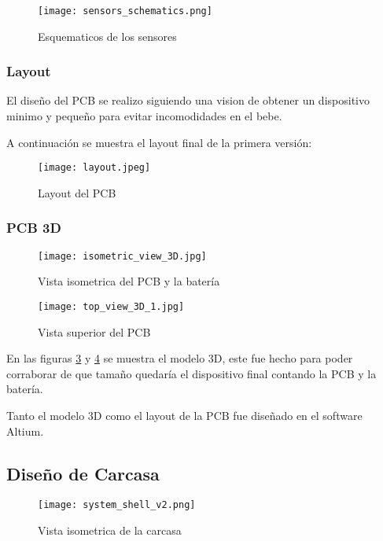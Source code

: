         \begin{figure}[htp!]
            \centering
            \texttt{[image: sensors\_schematics.png]}
            \caption{Esquematicos de los sensores}
            \label{fig: sensors_schematics}
        \end{figure}
        \FloatBarrier

        

    \subsubsection{Layout}
        El diseño del PCB se realizo siguiendo una vision de obtener un dispositivo 
        minimo y pequeño para evitar incomodidades en el bebe.

        A continuación se muestra el layout final de la primera versión:

        \begin{figure}[htp!]
            \centering
            \texttt{[image: layout.jpeg]}
            \caption{Layout del PCB}
            \label{fig: layout}
        \end{figure}
        \FloatBarrier

    \subsubsection{PCB 3D}
        \begin{figure}[htp!]
            \centering
            \texttt{[image: isometric\_view\_3D.jpg]}
            \caption{Vista isometrica del PCB y la batería}
            \label{fig: isometric_3d}
        \end{figure}
        \FloatBarrier
        \begin{figure}[htp!]
            \centering
            \texttt{[image: top\_view\_3D\_1.jpg]}
            \caption{Vista superior del PCB}
            \label{fig: top_3d}
        \end{figure}
        \FloatBarrier

        En las figuras \ref{fig: isometric_3d} y \ref{fig: top_3d} se muestra el modelo 3D, este fue hecho
        para poder corraborar de que tamaño quedaría el dispositivo final contando la PCB y la batería.

        Tanto el modelo 3D como el layout de la PCB fue diseñado en el software Altium.
    \subsection{Diseño de Carcasa}
        \begin{figure}[htp!]
            \centering
                \texttt{[image: system\_shell\_v2.png]}
                \caption{Vista isometrica de la carcasa}
                \label{fig: isometric_view_shell}
        \end{figure}
        \FloatBarrier

